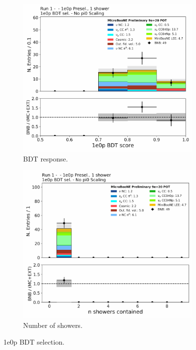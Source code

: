 \begin{figure}[H]
\begin{center}
\begin{subfigure}[b]{0.3\textwidth}
    \includegraphics[width=1.00\textwidth]{Fakedata/set5/zp_postsel_bdt.pdf}
    \caption{\label{fig:fakedata:set5:zp_postsel_bdt} BDT response.}
    \end{subfigure}
    \begin{subfigure}[b]{0.3\textwidth}
    \centering
    \includegraphics[width=1.00\textwidth]{Fakedata/set5/zp_postsel_nshr.pdf}
    \caption{\label{fig:fakedata:set5:zp_postsel_nshr} Number of showers.}
    \end{subfigure}
\caption{\label{fig:fakedata:set5:zpsel} 1e0p BDT selection.}
\end{center}
\end{figure}

